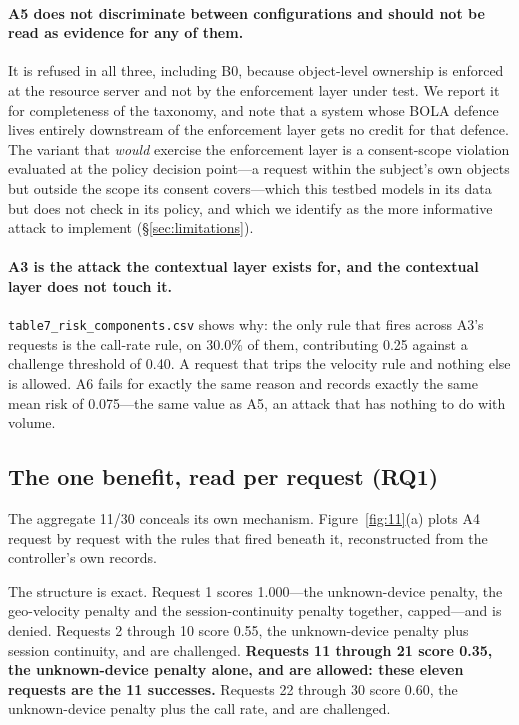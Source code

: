 \paragraph{A5 does not discriminate between configurations and should not be read as evidence for any of them.} It is refused in all three, including B0, because object-level ownership is enforced at the resource server and not by the enforcement layer under test. We report it for completeness of the taxonomy, and note that a system whose BOLA defence lives entirely downstream of the enforcement layer gets no credit for that defence. The variant that \textit{would} exercise the enforcement layer is a consent-scope violation evaluated at the policy decision point---a request within the subject's own objects but outside the scope its consent covers---which this testbed models in its data but does not check in its policy, and which we identify as the more informative attack to implement (\S\ref{sec:limitations}).

\paragraph{A3 is the attack the contextual layer exists for, and the contextual layer does not touch it.} \texttt{table7\_risk\_components.csv} shows why: the only rule that fires across A3's requests is the call-rate rule, on 30.0\% of them, contributing 0.25 against a challenge threshold of 0.40. A request that trips the velocity rule and nothing else is allowed. A6 fails for exactly the same reason and records exactly the same mean risk of 0.075---the same value as A5, an attack that has nothing to do with volume.

\subsection{The one benefit, read per request (RQ1)}
\label{sec:res-mechanism}

The aggregate 11/30 conceals its own mechanism. Figure~\ref{fig:11}(a) plots A4 request by request with the rules that fired beneath it, reconstructed from the controller's own records.

The structure is exact. Request 1 scores 1.000---the unknown-device penalty, the geo-velocity penalty and the session-continuity penalty together, capped---and is denied. Requests 2 through 10 score 0.55, the unknown-device penalty plus session continuity, and are challenged. \textbf{Requests 11 through 21 score 0.35, the unknown-device penalty alone, and are allowed: these eleven requests are the 11 successes.} Requests 22 through 30 score 0.60, the unknown-device penalty plus the call rate, and are challenged.

